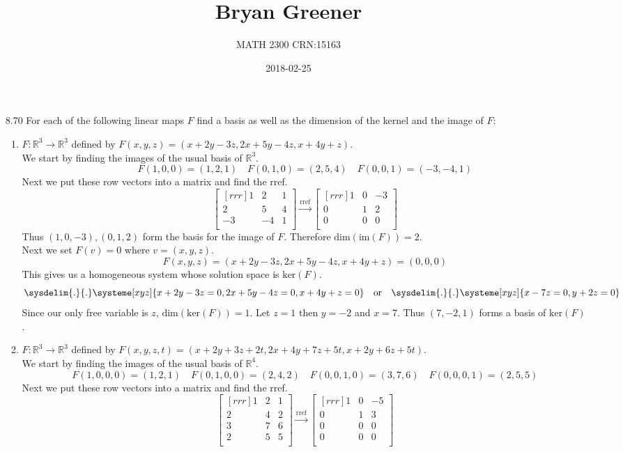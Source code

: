\documentclass[12pt]{article}
\title{Bryan Greener}
\author{MATH 2300 CRN:15163}
\date{2018-02-25}
\theoremstyle{definition}
\theoremstyle{plain}
\begin{document}
\maketitle

\TabPositions{4cm}

\begin{enumerate}
\item[8.70] For each of the following linear maps $F$ find a basis as well as the dimension of the kernel and the image of $F$:
	\begin{enumerate}
	\item $F:\mathbb{R}^3\rightarrow\mathbb{R}^3$ defined by $F(x,y,z)=(x+2y-3z,2x+5y-4z,x+4y+z)$.\\
	We start by finding the images of the usual basis of $\mathbb{R}^3$.
	\[ F(1,0,0)=(1,2,1) \quad F(0,1,0)=(2,5,4) \quad F(0,0,1)=(-3,-4,1) \]
	Next we put these row vectors into a matrix and find the rref.
	\[ \begin{bmatrix}[rrr]1&2&1\\2&5&4\\-3&-4&1\\\end{bmatrix} \xrightarrow[]{\mathrm{rref}} \begin{bmatrix}[rrr]1&0&-3\\0&1&2\\0&0&0\\\end{bmatrix} \]
	Thus $(1,0,-3),(0,1,2)$ form the basis for the image of $F$. Therefore $\mathrm{dim}(\mathrm{im}(F)) = 2$.\\
	Next we set $F(v)=0$ where $v=(x,y,z)$.
	\[ F(x,y,z)=(x+2y-3z,2x+5y-4z,x+4y+z)=(0,0,0) \]
	This gives us a homogeneous system whose solution space is $\mathrm{ker}(F)$.
	\[ \sysdelim{.}{.}\systeme[xyz]{x+2y-3z=0,2x+5y-4z=0,x+4y+z=0} \quad \mathrm{or} \quad \sysdelim{.}{.}\systeme[xyz]{x-7z=0,y+2z=0} \]
	Since our only free variable is $z$, $\mathrm{dim}(\mathrm{ker}(F)) = 1$. Let $z=1$ then $y=-2$ and $x=7$. Thus $(7,-2,1)$ forms a basis of $\mathrm{ker}(F)$.
	\item $F:\mathbb{R}^3\rightarrow\mathbb{R}^3$ defined by $F(x,y,z,t)=(x+2y+3z+2t,2x+4y+7z+5t,x+2y+6z+5t)$.\\
	We start by finding the images of the usual basis of $\mathbb{R}^4$.
	\[ F(1,0,0,0)=(1,2,1) \quad F(0,1,0,0)=(2,4,2) \quad F(0,0,1,0)=(3,7,6) \quad F(0,0,0,1)=(2,5,5) \]
	Next we put these row vectors into a matrix and find the rref.
	\[ \begin{bmatrix}[rrr]1&2&1\\2&4&2\\3&7&6\\2&5&5\\\end{bmatrix} \xrightarrow[]{\mathrm{rref}} \begin{bmatrix}[rrr]1&0&-5\\0&1&3\\0&0&0\\0&0&0\\\end{bmatrix} \]

\end{enumerate}
\end{enumerate}
\end{document}
